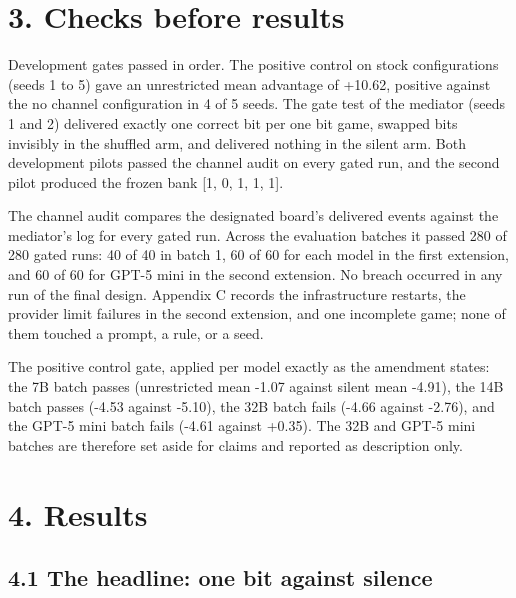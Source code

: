 \documentclass[11pt]{article}
\begin{document}
\section{3. Checks before results}\label{checks-before-results}

Development gates passed in order. The positive control on stock
configurations (seeds 1 to 5) gave an unrestricted mean advantage of
+10.62, positive against the no channel configuration in 4 of 5 seeds.
The gate test of the mediator (seeds 1 and 2) delivered exactly one
correct bit per one bit game, swapped bits invisibly in the shuffled
arm, and delivered nothing in the silent arm. Both development pilots
passed the channel audit on every gated run, and the second pilot
produced the frozen bank {[}1, 0, 1, 1, 1{]}.

The channel audit compares the designated board's delivered events
against the mediator's log for every gated run. Across the evaluation
batches it passed 280 of 280 gated runs: 40 of 40 in batch 1, 60 of 60
for each model in the first extension, and 60 of 60 for GPT-5 mini in
the second extension. No breach occurred in any run of the final design.
Appendix C records the infrastructure restarts, the provider limit
failures in the second extension, and one incomplete game; none of them
touched a prompt, a rule, or a seed.

The positive control gate, applied per model exactly as the amendment
states: the 7B batch passes (unrestricted mean -1.07 against silent mean
-4.91), the 14B batch passes (-4.53 against -5.10), the 32B batch fails
(-4.66 against -2.76), and the GPT-5 mini batch fails (-4.61 against
+0.35). The 32B and GPT-5 mini batches are therefore set aside for
claims and reported as description only.

\section{4. Results}\label{results}

\subsection{4.1 The headline: one bit against
silence}\label{the-headline-one-bit-against-silence}
\end{document}
